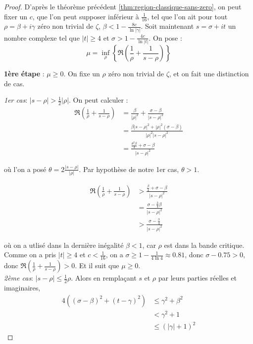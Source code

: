\documentclass[french]{report}
\begin{document}
\begin{proof}
  D'après le théorème précédent \ref{thm:region-classique-sans-zero}, on peut fixer un $c$, que l'on peut supposer inférieur à $\frac{1}{16}$, tel que l'on ait pour tout $\rho=\beta+i\gamma$ zéro non trivial de $\zeta$, $\beta<1-\frac{8c}{\ln|\gamma|}$. Soit maintenant $s=\sigma+it$ un nombre complexe tel que $|t|\geq 4$ et $\sigma>1-\frac{4c}{\ln |t|}$. On pose :
  \[
    \mu=\inf_\rho\left\{\Re\left(\frac{1}{\rho}+\frac{1}{s-\rho}\right)\right\}
  \]

  \textbf{1ère étape} : $\mu\geq0$. On fixe un $\rho$ zéro non trivial de $\zeta$, et on fait une distinction de cas.

  \textit{1er cas}: $|s-\rho|>\frac{1}{2}|\rho|$. On peut calculer :
  \begin{align}
    \Re\left(\frac{1}{\rho}+\frac{1}{s-\rho}\right)
    &= \frac{\beta}{|\rho|^2} + \frac{\sigma - \beta}{|s-\rho|^2} \\
    &= \frac{\beta|s-\rho|^2 + |\rho|^2(\sigma-\beta)}{|\rho|^2|s-\rho|^2} \\
    &= \frac{\frac{\theta^2 \beta}{4} + \sigma - \beta}{|s-\rho|^2} \label{eq:re-rho-s-moins-rho}
  \end{align}

  où l'on a posé $\theta = 2\frac{|s-\rho|}{|\rho|}$. Par hypothèse de notre 1er cas, $\theta>1$. 
    
  \begin{align*}
    \Re\left(\frac{1}{\rho}+\frac{1}{s-\rho}\right)
    & > \frac{\frac{\beta}{4} + \sigma - \beta}{|s-\rho|^2} \\
    & = \frac{\sigma - \frac{3}{4}\beta}{|s-\rho|^2} \\
    & > \frac{\sigma - \frac{3}{4}}{|s-\rho|^2}
  \end{align*}

  où on a utlisé dans la dernière inégalité $\beta<1$, car $\rho$ est dans la bande critique. Comme on a pris $|t|\geq 4$ et $c<\frac{1}{16}$, on a $\sigma\geq 1-\frac{1}{4\ln 4}\approx 0.81$, donc $\sigma-0.75>0$, donc $ \Re\left(\frac{1}{\rho}+\frac{1}{s-\rho}\right)>0$. Et il suit que $\mu\geq0$.
  \\

  \textit{2ème cas}: $|s-\rho|\leq\frac{1}{2}\rho$. Alors en remplaçant $s$ et $\rho$ par leurs parties réelles et imaginaires, 
  \begin{align*}
    4((\sigma-\beta)^2 + (t-\gamma)^2)
    &\leq \gamma^2 + \beta^2 \\
    &< \gamma^2 + 1 \\
    &\leq (|\gamma|+1)^2
  \end{align*}


\end{proof}
\end{document}
